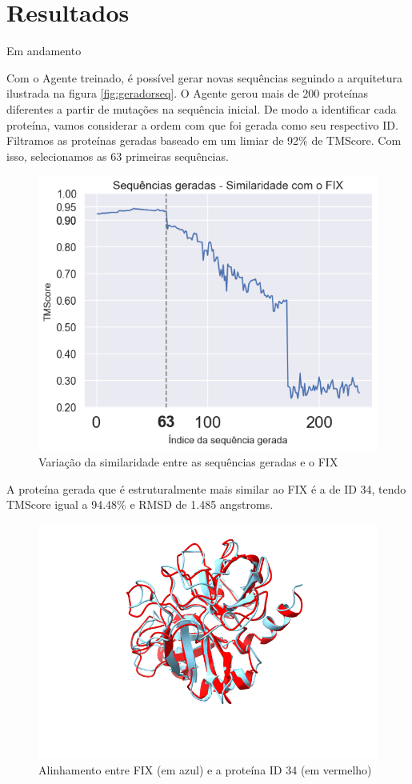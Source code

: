 \chapter{Resultados}

{\color{red} Em andamento}

Com o Agente treinado, é possível gerar novas sequências seguindo a arquitetura ilustrada na figura \ref{fig:geradorseq}. 
O Agente gerou mais de 200 proteínas diferentes a partir de mutações na sequência inicial. 
De modo a identificar cada proteína, vamos considerar a ordem com que foi gerada como seu respectivo ID.
Filtramos as proteínas geradas baseado em um limiar de 92\% de TMScore. Com isso, selecionamos as 63 primeiras sequências.  

\begin{figure}[H]
    \centering
    \includegraphics[width=.6\linewidth]{figuras/plot_tmscore_decreasing.png}    
    \caption{Variação da similaridade entre as sequências geradas e o FIX }
    \label{fig:tmscore_decreasing}
  \end{figure}


A proteína gerada que é estruturalmente mais similar ao FIX é a de ID 34,
tendo TMScore igual a 94.48\% e RMSD de 1.485 angstroms. 

\begin{figure}[H]
    \centering
    \includegraphics[width=.6\linewidth]{figuras/FIXvsID34.png}    
    \caption{Alinhamento entre FIX (em azul) e a proteína ID 34 (em vermelho)}
    \label{fig:FIX_vs_ID34}
\end{figure}



